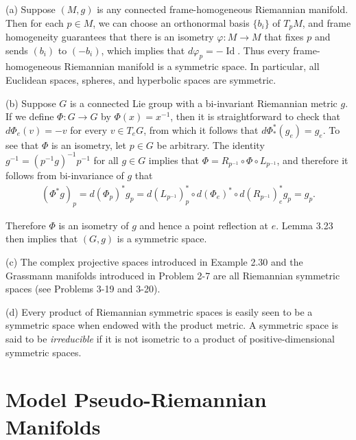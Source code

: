 \begin{example}\label{ex:riemannian-symmetric-spaces}

(a) Suppose $(M, g)$ is any connected frame-homogeneous Riemannian manifold. Then for each $p \in M$, we can choose an orthonormal basis $\{b_i\}$ of $T_p M$, and frame homogeneity guarantees that there is an isometry $\varphi: M \to M$ that fixes $p$ and sends $(b_i)$ to $(-b_i)$, which implies that $d\varphi_p = -\operatorname{Id}$. Thus every frame-homogeneous Riemannian manifold is a symmetric space. In particular, all Euclidean spaces, spheres, and hyperbolic spaces are symmetric.

(b) Suppose $G$ is a connected Lie group with a bi-invariant Riemannian metric $g$. If we define $\Phi: G \to G$ by $\Phi(x) = x^{-1}$, then it is straightforward to check that $d\Phi_e(v) = -v$ for every $v \in T_e G$, from which it follows that $d\Phi_*^*(g_e) = g_e$. To see that $\Phi$ is an isometry, let $p \in G$ be arbitrary. The identity $g^{-1} = (p^{-1} g)^{-1} p^{-1}$ for all $g \in G$ implies that $\Phi = R_{p^{-1}} \circ \Phi \circ L_{p^{-1}}$, and therefore it follows from bi-invariance of $g$ that
\begin{align*}
(\Phi^* g)_p = d(\Phi_p)^* g_p = d(L_{p^{-1}})_p^* \circ d(\Phi_e)^* \circ d(R_{p^{-1}})_e^* g_p = g_p.
\end{align*}

Therefore $\Phi$ is an isometry of $g$ and hence a point reflection at $e$. Lemma 3.23 then implies that $(G, g)$ is a symmetric space.

(c) The complex projective spaces introduced in Example 2.30 and the Grassmann manifolds introduced in Problem 2-7 are all Riemannian symmetric spaces (see Problems 3-19 and 3-20).

(d) Every product of Riemannian symmetric spaces is easily seen to be a symmetric space when endowed with the product metric. A symmetric space is said to be \emph{irreducible} if it is not isometric to a product of positive-dimensional symmetric spaces.
\end{example}

\section{Model Pseudo-Riemannian Manifolds}

